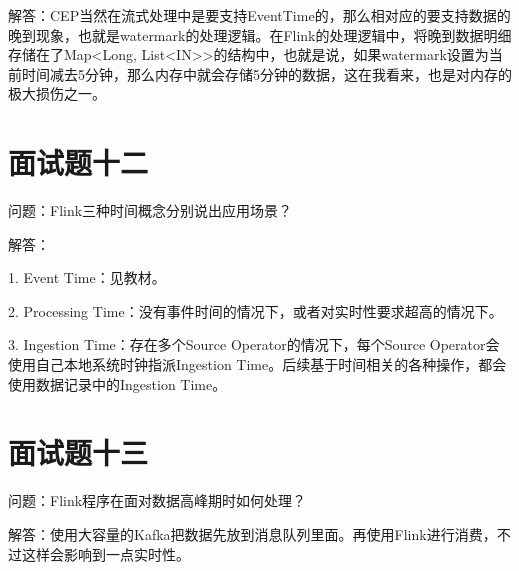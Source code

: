 \documentclass[oneside]{ctexbook}
\begin{document}
解答：CEP当然在流式处理中是要支持EventTime的，那么相对应的要支持数据的晚到现象，也就是watermark的处理逻辑。在Flink的处理逻辑中，将晚到数据明细存储在了Map<Long, List<IN>>的结构中，也就是说，如果watermark设置为当前时间减去5分钟，那么内存中就会存储5分钟的数据，这在我看来，也是对内存的极大损伤之一。

\section{面试题十二}

问题：Flink三种时间概念分别说出应用场景？

解答：

1. Event Time：见教材。

2. Processing Time：没有事件时间的情况下，或者对实时性要求超高的情况下。

3. Ingestion Time：存在多个Source Operator的情况下，每个Source Operator会使用自己本地系统时钟指派Ingestion Time。后续基于时间相关的各种操作，都会使用数据记录中的Ingestion Time。

\section{面试题十三}

问题：Flink程序在面对数据高峰期时如何处理？

解答：使用大容量的Kafka把数据先放到消息队列里面。再使用Flink进行消费，不过这样会影响到一点实时性。
\end{document}
